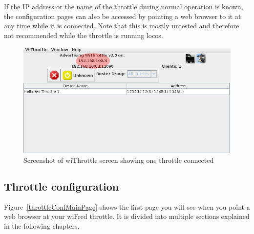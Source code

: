 \documentclass[11pt,a4paper]{scrartcl}
\begin{document}
If the IP address or the name of the throttle during normal operation is known, the configuration pages can also be accessed by pointing a web browser to it at any time while it is connected. Note that this is mostly untested and therefore not recommended while the throttle is running locos.

\begin{figure}[tbh]
  \centering
  \includegraphics[width=0.8 \textwidth]{images/withrottle_Screenshot}
  \caption{Screenshot of wiThrottle screen showing one throttle connected}
  \label{withrottleScreenshot}
\end{figure}

\subsection{Throttle configuration}

Figure~\ref{throttleConfMainPage} shows the first page you will see when you point a web browser at your wiFred throttle. It is divided into multiple sections explained in the following chapters.
\end{document}

